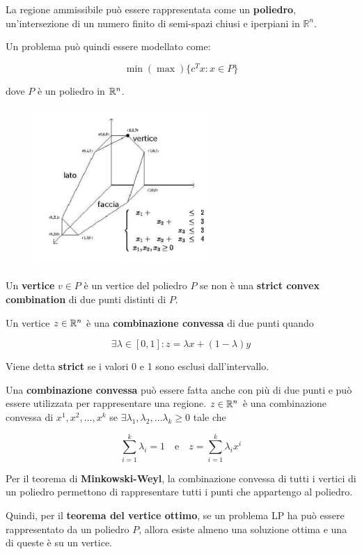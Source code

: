 \noindent La regione ammissibile può essere rappresentata come un \textbf{poliedro}, un'intersezione di un numero finito di semi-spazi chiusi e iperpiani in $\mathbb{R}^n$.

Un problema può quindi essere modellato come:

$$
\min (\max) \{c^T x : x \in P\}
$$

\noindent dove $P$ è un poliedro in $\mathbb{R}^n$.

\begin{figure}[htbp]
	\centering
	\includegraphics[width=0.6\textwidth]{images/l9-fig-1.png}
\end{figure}

\noindent Un \textbf{vertice} $v \in P$ è un vertice del poliedro $P$ se non è una \textbf{strict convex combination} di due punti distinti di $P$.

Un vertice $z \in \mathbb{R}^n$ è una \textbf{combinazione convessa} di due punti quando

$$
\exists \lambda \in [0,1] : z = \lambda x + (1-\lambda)y
$$

\noindent Viene detta \textbf{strict} se i valori 0 e 1 sono esclusi dall'intervallo.

Una \textbf{combinazione convessa} può essere fatta anche con più di due punti e può essere utilizzata per rappresentare una regione.
$z \in \mathbb{R}^n$ è una combinazione convessa di $x^1, x^2, \ldots, x^k$ se $\exists \lambda_1, \lambda_2, \ldots \lambda_k \geq 0$ tale che 

$$
\sum\limits_{i=1}^{k} \lambda_i = 1 \quad \text{e}\quad z = \sum\limits_{i=1}^{k} \lambda_ix^i
$$

\noindent Per il teorema di \textbf{Minkowski-Weyl}, la combinazione convessa di tutti i vertici di un poliedro permettono di rappresentare tutti i punti che appartengo al poliedro.

Quindi, per il \textbf{teorema del vertice ottimo}, se un problema LP ha può essere rappresentato da un poliedro $P$, allora esiste almeno una soluzione ottima e una di queste è su un vertice.


